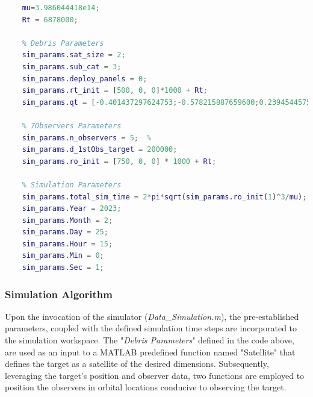 \begin{lstlisting}[language=Matlab, caption= Parameters introduced into the \textit{Main\_Program.m} through \textit{Sim\_config.m}.]
    % Global Constants
    mu=3.986044418e14;
    Rt = 6878000;
    
    % Debris Parameters
    sim_params.sat_size = 2;   
    sim_params.sub_cat = 3;    
    sim_params.deploy_panels = 0;   
    sim_params.rt_init = [500, 0, 0]*1000 + Rt;
    sim_params.qt = [-0.401437297624753;-0.578215887659600;0.239454457519217;0.668712229668289];
    
    % 7Observers Parameters
    sim_params.n_observers = 5;  %
    sim_params.d_1stObs_target = 200000;
    sim_params.ro_init = [750, 0, 0] * 1000 + Rt;
    
    % Simulation Parameters
    sim_params.total_sim_time = 2*pi*sqrt(sim_params.ro_init(1)^3/mu);   
    sim_params.Year = 2023;
    sim_params.Month = 2;
    sim_params.Day = 25;
    sim_params.Hour = 15;
    sim_params.Min = 0;
    sim_params.Sec = 1;
\end{lstlisting}



\subsubsection{Simulation Algorithm}
Upon the invocation of the simulator (\textit{Data\_Simulation.m}), the pre-established parameters, coupled with the defined simulation time steps are incorporated to the simulation workspace. The "\textit{Debris Parameters}" defined in the code above, are used as an input to a MATLAB predefined function named "Satellite" that defines the target as a satellite of the desired dimensions. Subsequently, leveraging the target's position and observer data, two functions are employed to position the observers in orbital locations conducive to observing the target.

